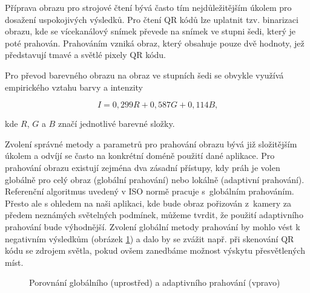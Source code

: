 Příprava obrazu pro strojové čtení bývá často tím nejdůležitějším úkolem pro
dosažení uspokojivých výsledků. Pro čtení QR kódů lze uplatnit tzv. binarizaci
obrazu, kde se vícekanálový snímek převede na snímek ve stupni šedi, který
je poté prahován. Prahováním vzniká obraz, který obsahuje pouze dvě hodnoty,
jež představují tmavé a světlé pixely QR kódu.

Pro převod barevného obrazu na obraz ve stupních šedi se obvykle využívá
empirického vztahu barvy a intenzity

\begin{equation}
  I = 0,299R + 0,587G + 0,114B\mbox{,}
\end{equation}

\noindent kde $R$, $G$ a $B$ značí jednotlivé barevné složky.

Zvolení správné metody a parametrů pro prahování obrazu bývá již složitějším
úkolem a odvíjí se často na konkrétní doméně použití dané aplikace. Pro
prahování obrazu existují zejména dva zásadní přístupy, kdy práh je volen
globálně pro celý obraz (globální prahování) nebo lokálně (adaptivní 
prahování). Referenční algoritmus uvedený v ISO normě pracuje s~globálním
prahováním. Přesto ale s ohledem na naši aplikaci, kde bude obraz pořizován z~kamery za předem neznámých světelných podmínek, můžeme tvrdit, že použití
adaptivního prahování bude výhodnější. Zvolení globální metody prahování by
mohlo vést k negativním výsledkům (obrázek
\ref{GlobalAdaptiveThresholdingComparision}) a dalo by se zvážit např. při skenování QR kódu se zdrojem světla, pokud ovšem zanedbáme možnost výskytu
přesvětlených míst.

\begin{figure}[H]
  \begin{center}
    \caption{Porovnání globálního (uprostřed) a adaptivního prahování (vpravo)}
    \label{GlobalAdaptiveThresholdingComparision}
  \end{center}
\end{figure}

